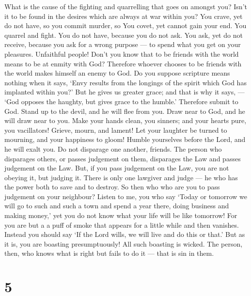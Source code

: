  What is the cause of the fighting and quarrelling that goes
on amongst you? Isn't it to be found in the desires which are always at
war within you?  You crave, yet do not have, so you commit
murder, so You covet, yet cannot gain your end. You quarrel and fight.
You do not have, because you do not ask.  You ask, yet do
not receive, because you ask for a wrong purpose --- to spend what you
get on your pleasures.  Unfaithful people! Don't you know
that to be friends with the world means to be at enmity with God?
Therefore whoever chooses to be friends with the world makes himself an
enemy to God.  Do you suppose scripture means nothing when
it says, `Envy results from the longings of the spirit which God has
implanted within you?'  But he gives us greater grace; and
that is why it says, --- `God opposes the haughty, but gives grace to
the humble.'  Therefore submit to God. Stand up to the
devil, and he will flee from you.  Draw near to God, and he
will draw near to you. Make your hands clean, you sinners; and your
hearts pure, you vacillators!  Grieve, mourn, and lament!
Let your laughter be turned to mourning, and your happiness to gloom!
 Humble yourselves before the Lord, and he will exalt you.
 Do not disparage one another, friends. The person who
disparages others, or passes judgement on them, disparages the Law and
passes judgement on the Law. But, if you pass judgement on the Law, you
are not obeying it, but judging it.  There is only one
lawgiver and judge --- he who has the power both to save and to destroy.
So then who who are you to pass judgement on your neighbour?
 Listen to me, you who say `Today or tomorrow we will go to
such and such a town and spend a year there, doing business and making
money,'  yet you do not know what your life will be like
tomorrow! For you are but a a puff of smoke that appears for a little
while and then vanishes.  Instead you should say `If the
Lord wills, we will live and do this or that.'  But as it
is, you are boasting presumptuously! All such boasting is wicked.
 The person, then, who knows what is right but fails to do
it --- that is sin in them.

\hypertarget{section-4}{%
\section{5}\label{section-4}}

